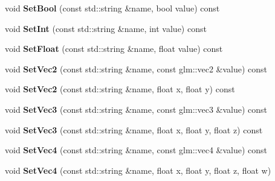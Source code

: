 \begin{DoxyCompactItemize}
\item 
\mbox{\label{classnabla_1_1renderer_1_1_shader_acbbb790ddbeff79544b7f39617bc7643}} 
void {\bfseries Set\+Bool} (const std\+::string \&name, bool value) const
\item 
\mbox{\label{classnabla_1_1renderer_1_1_shader_adf63bd0d75e0412e8f8b920efb135e4a}} 
void {\bfseries Set\+Int} (const std\+::string \&name, int value) const
\item 
\mbox{\label{classnabla_1_1renderer_1_1_shader_aead370b36d0c384eadb4674bcdfb4650}} 
void {\bfseries Set\+Float} (const std\+::string \&name, float value) const
\item 
\mbox{\label{classnabla_1_1renderer_1_1_shader_a566954445335d6d11bc96eef14d2889a}} 
void {\bfseries Set\+Vec2} (const std\+::string \&name, const glm\+::vec2 \&value) const
\item 
\mbox{\label{classnabla_1_1renderer_1_1_shader_ada067dc8287cc0894075f249dfb4e0c0}} 
void {\bfseries Set\+Vec2} (const std\+::string \&name, float x, float y) const
\item 
\mbox{\label{classnabla_1_1renderer_1_1_shader_aae4d01312a47d1f3764bb3412af4bdc1}} 
void {\bfseries Set\+Vec3} (const std\+::string \&name, const glm\+::vec3 \&value) const
\item 
\mbox{\label{classnabla_1_1renderer_1_1_shader_a9f3875eb38051e432bd96c006b8b9f4d}} 
void {\bfseries Set\+Vec3} (const std\+::string \&name, float x, float y, float z) const
\item 
\mbox{\label{classnabla_1_1renderer_1_1_shader_a1102eea8b5247cb54826772061137102}} 
void {\bfseries Set\+Vec4} (const std\+::string \&name, const glm\+::vec4 \&value) const
\item 
\mbox{\label{classnabla_1_1renderer_1_1_shader_ac40ede06424f10dc90bb7fb4667119ec}} 
void {\bfseries Set\+Vec4} (const std\+::string \&name, float x, float y, float z, float w)

\end{DoxyCompactItemize}
